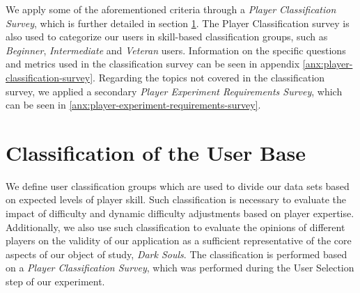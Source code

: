 We apply some of the aforementioned criteria through a \emph{Player Classification Survey}, which is further detailed in section \ref{sec:user-base-classification}. The Player Classification survey is also used to categorize our users in skill-based classification groups, such as \emph{Beginner}, \emph{Intermediate} and \emph{Veteran} users. Information on the specific questions and metrics used in the classification survey can be seen in appendix \ref{anx:player-classification-survey}. Regarding the topics not covered in the classification survey, we applied a secondary \emph{Player Experiment Requirements Survey}, which can be seen in \ref{anx:player-experiment-requirements-survey}.




\section{Classification of the User Base}
\label{sec:user-base-classification}

We define user classification groups which are used to divide our data sets based on expected levels of player skill. Such classification is necessary to evaluate the impact of difficulty and dynamic difficulty adjustments based on player expertise. Additionally, we also use such classification to evaluate the opinions of different players on the validity of our application as a sufficient representative of the core aspects of our object of study, \emph{Dark Souls}. The classification is performed based on a \emph{Player Classification Survey}, which was performed during the User Selection step of our experiment.



